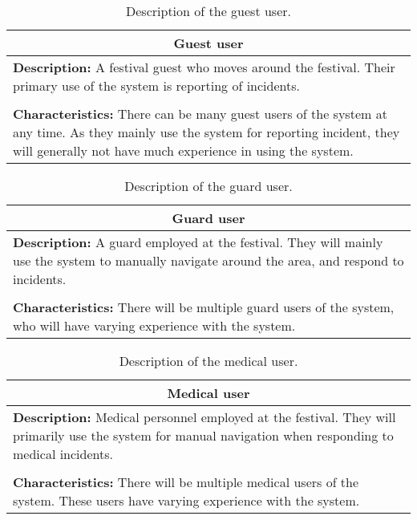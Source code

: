\begin{table}[htbp]
    \centering
    \begin{tabularx}{/4}{X}
        \toprule
        \multicolumn{1}{c}{\textbf{Guest user}} \\ 
        \midrule
        \textbf{Description:} A festival guest who moves around the festival. Their primary use of the system is reporting of incidents. \\
        \\
        \textbf{Characteristics:} There can be many guest users of the system at any time. As they mainly use the system for reporting incident, they will generally not have much experience in using the system. \\
        \bottomrule
    \end{tabularx}
    \caption{Description of the guest user.}
    \label{tab:guest_user}
\end{table}

\begin{table}[htbp]
    \centering
    \begin{tabularx}{/4}{X}
        \toprule
        \multicolumn{1}{c}{\textbf{Guard user}} \\ 
        \midrule
        \textbf{Description:} A guard employed at the festival. They will mainly use the system to manually navigate around the area, and respond to incidents. \\
        \\
        \textbf{Characteristics:} There will be multiple guard users of the system, who will have varying experience with the system. \\
        \bottomrule
    \end{tabularx}
    \caption{Description of the guard user.}
    \label{tab:guard_user}
\end{table}

\begin{table}[htbp]
    \centering
    \begin{tabularx}{/4}{X}
        \toprule
        \multicolumn{1}{c}{\textbf{Medical user}} \\ 
        \midrule
        \textbf{Description:} Medical personnel employed at the festival. They will primarily use the system for manual navigation when responding to medical incidents. \\
        \\
        \textbf{Characteristics:} There will be multiple medical users of the system. These users have varying experience with the system. \\
        \bottomrule
    \end{tabularx}
    \caption{Description of the medical user.}
    \label{tab:med_user}
\end{table}
